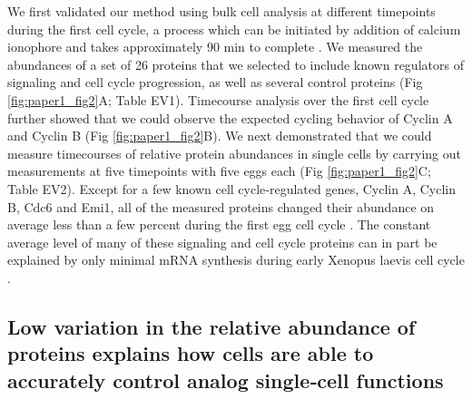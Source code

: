 We first validated our method using bulk cell analysis at different timepoints during the first cell cycle, a process which can be initiated by addition of calcium ionophore and takes approximately 90 min to complete \cite{Rankin1997}. We measured the abundances of a set of 26 proteins that we selected to include known regulators of signaling and cell cycle progression, as well as several control proteins (Fig \ref{fig:paper1_fig2}A; Table EV1). Timecourse analysis over the first cell cycle further showed that we could observe the expected cycling behavior of Cyclin A and Cyclin B (Fig \ref{fig:paper1_fig2}B). We next demonstrated that we could measure timecourses of relative protein abundances in single cells by carrying out measurements at five timepoints with five eggs each (Fig \ref{fig:paper1_fig2}C; Table EV2). Except for a few known cell cycle‐regulated genes, Cyclin A, Cyclin B, Cdc6 and Emi1, all of the measured proteins changed their abundance on average less than a few percent during the first egg cell cycle \cite{Peshkin2015}. The constant average level of many of these signaling and cell cycle proteins can in part be explained by only minimal mRNA synthesis during early Xenopus laevis cell cycle \cite{Krauchunas2013}.

\subsection{Low variation in the relative abundance of proteins explains how cells are able to accurately control analog single‐cell functions}

